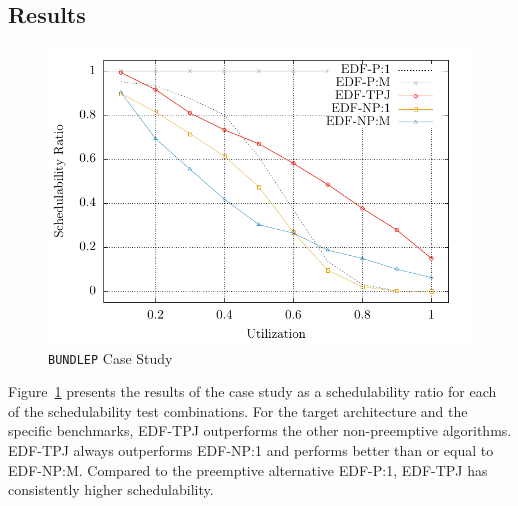 \subsection{Results}


\begin{figure}
  \includegraphics[width=\linewidth]{plot/cs-ratio/cs-ratio}
  \caption{\texttt{BUNDLEP} Case Study}
  \label{fig:cs-ratio}
\end{figure}

Figure~\ref{fig:cs-ratio} presents the results of the \bundlep{} case
study as a schedulability ratio for each of the schedulability test
combinations. For the target architecture and the specific benchmarks,
EDF-TPJ outperforms the other non-preemptive algorithms. EDF-TPJ
always outperforms EDF-NP:1 and performs better than or equal to
EDF-NP:M. Compared to the preemptive alternative EDF-P:1, EDF-TPJ
has consistently higher schedulability. 


